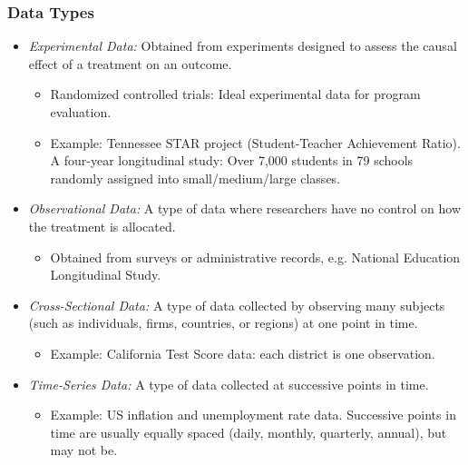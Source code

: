 

\begin{frame}
\frametitle{Data Types}
\begin{itemize}
\item \emph{Experimental Data:} Obtained from experiments designed to assess
the causal effect of a treatment on an outcome.
\begin{itemize}
\item Randomized controlled trials: Ideal experimental data for program evaluation. 
\item Example: Tennessee STAR project (Student-Teacher Achievement Ratio). A four-year longitudinal study: Over 7,000 students in 79 schools randomly assigned into small/medium/large classes.
\end{itemize}
\item \emph{Observational Data:} A type of data where researchers have no control on how the treatment is allocated.
\begin{itemize}
\item Obtained from surveys or administrative records, e.g. National Education Longitudinal Study. 
\end{itemize}
\item \emph{Cross-Sectional Data:} A type of data collected by observing many subjects (such as individuals, firms, countries, or regions) at one point in time.
\begin{itemize}
\item Example: California Test Score data: each district is one observation.
\end{itemize}
\item \emph{Time-Series Data:} A type of data collected at successive points in time. 
\begin{itemize}
\item Example: US inflation and unemployment rate data. Successive points in time are usually equally spaced (daily, monthly, quarterly, annual), but may not be.
\end{itemize}
\end{itemize}
\end{frame}


